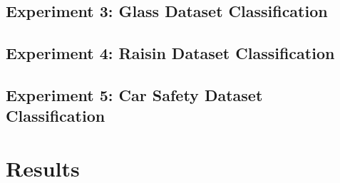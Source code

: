 \documentclass[a4paper, 12pt]{report}
\begin{document}
\section{Experiment 3: Glass Dataset Classification}

\section{Experiment 4: Raisin Dataset Classification}

\section{Experiment 5: Car Safety Dataset Classification}

\chapter{Results}
\label{ch:Results}


\end{document}
